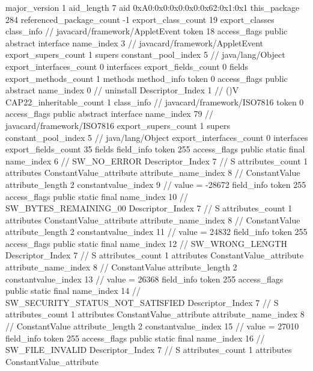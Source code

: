 {{{			major_version	1
			aid_length	7
			aid	0xA0:0x0:0x0:0x0:0x62:0x1:0x1
		}
	}
	this_package	284
	referenced_package_count	-1
	export_class_count	19
	export_classes {
		class_info {		// javacard/framework/AppletEvent
			token	18
			access_flags	public abstract interface
			name_index	3		// javacard/framework/AppletEvent
			export_supers_count	1
			supers {
				constant_pool_index	5		// java/lang/Object
			}
			export_interfaces_count	0
			interfaces {
			}
			export_fields_count	0
			fields {
			}
			export_methods_count	1
			methods {
				method_info {
					token	0
					access_flags	public abstract
					name_index	0		// uninstall
					Descriptor_Index	1		// ()V
				}
			}
			CAP22_inheritable_count	1
		}
		class_info {		// javacard/framework/ISO7816
			token	0
			access_flags	public abstract interface
			name_index	79		// javacard/framework/ISO7816
			export_supers_count	1
			supers {
				constant_pool_index	5		// java/lang/Object
			}
			export_interfaces_count	0
			interfaces {
			}
			export_fields_count	35
			fields {
			field_info {
				token	255
				access_flags	public static final
				name_index	6		// SW_NO_ERROR
				Descriptor_Index	7		// S
				attributes_count	1
				attributes {
				ConstantValue_attribute {
					attribute_name_index	8		// ConstantValue
					attribute_length	2
					constantvalue_index	9		// value = -28672
				}
				}
			}
			field_info {
				token	255
				access_flags	public static final
				name_index	10		// SW_BYTES_REMAINING_00
				Descriptor_Index	7		// S
				attributes_count	1
				attributes {
				ConstantValue_attribute {
					attribute_name_index	8		// ConstantValue
					attribute_length	2
					constantvalue_index	11		// value = 24832
				}
				}
			}
			field_info {
				token	255
				access_flags	public static final
				name_index	12		// SW_WRONG_LENGTH
				Descriptor_Index	7		// S
				attributes_count	1
				attributes {
				ConstantValue_attribute {
					attribute_name_index	8		// ConstantValue
					attribute_length	2
					constantvalue_index	13		// value = 26368
				}
				}
			}
			field_info {
				token	255
				access_flags	public static final
				name_index	14		// SW_SECURITY_STATUS_NOT_SATISFIED
				Descriptor_Index	7		// S
				attributes_count	1
				attributes {
				ConstantValue_attribute {
					attribute_name_index	8		// ConstantValue
					attribute_length	2
					constantvalue_index	15		// value = 27010
				}
				}
			}
			field_info {
				token	255
				access_flags	public static final
				name_index	16		// SW_FILE_INVALID
				Descriptor_Index	7		// S
				attributes_count	1
				attributes {
				ConstantValue_attribute {
}}}}}}}
